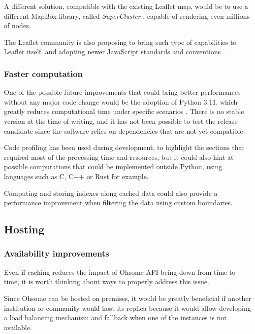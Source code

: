 \documentclass{Configuration_Files/PoliMi3i_thesis}
\begin{document}
A different solution, compatible with the existing Leaflet map, would be to use a different MapBox library, called \textit{SuperCluster} \cite{Supercluster2022}, capable of rendering even millions of nodes.

The Leaflet community is also proposing to bring such type of capabilities to Leaflet itself, and adopting newer JavaScript standards and conventions \cite{ModernJavaScriptIssue}.

\subsubsection{Faster computation}

One of the possible future improvements that could bring better performances without any major code change would be the adoption of Python 3.11, which greatly reduces computational time under specific scenarios \cite{WhatNewPython}. There is no stable version at the time of writing, and it has not been possible to test the release candidate since the software relies on dependencies that are not yet compatible.

Code profiling has been used during development, to highlight the sections that required most of the processing time and resources, but it could also hint at possible computations that could be implemented outside Python, using languages such as C, C++ or Rust for example.

Computing and storing indexes along cached data could also provide a performance improvement when filtering the data using custom boundaries.

\subsection{Hosting}

\subsubsection{Availability improvements}

Even if caching reduces the impact of Ohsome API being down from time to time, it is worth thinking about ways to properly address this issue.

Since Ohsome can be hosted on premises, it would be greatly beneficial if another institution or community would host its replica because it would allow developing a load balancing mechanism and fallback when one of the instances is not available.

\end{document}
